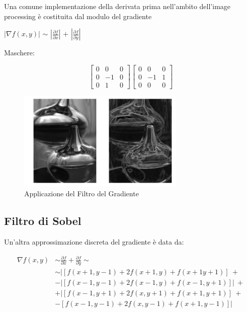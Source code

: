 Una comune implementazione della derivata prima nell'ambito dell'image processing è costituita dal modulo del gradiente

\begin{center}
    $| \nabla f(x,y) |$ $\sim$ $|\frac{\partial{f}}{\partial{x}}|$ $+$ $|\frac{\partial{f}}{\partial{y}}|$
\end{center}

Maschere:

\begin{center}
    \[
        \begin{bmatrix}
            0 & 0  & 0 \\
            0 & -1 & 0 \\
            0 & 1  & 0
        \end{bmatrix}
        \begin{bmatrix}
            0 & 0  & 0 \\
            0 & -1 & 1 \\
            0 & 0  & 0
        \end{bmatrix}
    \]
\end{center}

\begin{figure}[H]
    \centering
    \includegraphics[width=8cm, keepaspectratio]{capitoli/immagini/imgs/gradiente.png}
    \caption{Applicazione del Filtro del Gradiente}
\end{figure}

\subsection{Filtro di Sobel}
Un'altra approssimazione discreta del gradiente è data da:

\begin{align*}
    \nabla f(x,y) & \sim \frac{\partial{f}}{\partial{x}} + \frac{\partial{f}}{\partial{y}} \sim \\
                  & \sim  |[f(x+1,y-1) + 2f(x+1,y) + f(x+1 y+1)]  \ +                           \\
                  & - |[f(x-1, y-1)+2f(x-1,y) + f(x-1, y+1)]|     \ +                           \\
                  & + |[f(x-1, y+1) + 2f(x,y+1)+f(x+1,y+1)]       \ +                           \\
                  & - [f(x-1,y -1) + 2f(x,y-1) + f(x+1,y-1)]|
\end{align*}

